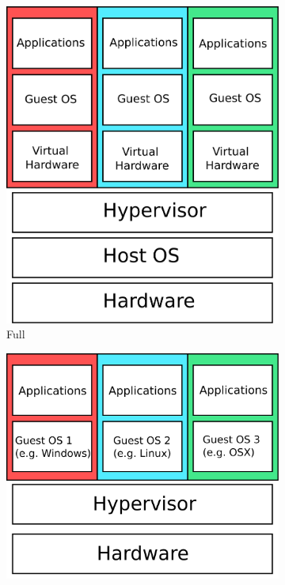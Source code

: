 \begin{figure}[t]
	\begin{subfigure}[b]{0.32\textwidth}  
	\centering
\includegraphics[width=\textwidth, keepaspectratio]{fullvirt.png}%
  \caption{Full }
  \label{fig:full}
 \end{subfigure} 
 \hfill
 \begin{subfigure}[b]{0.32\textwidth}  
 \centering
  \includegraphics[width=\textwidth, keepaspectratio]{hwlayer.png}%

\end{subfigure}
\end{figure}
